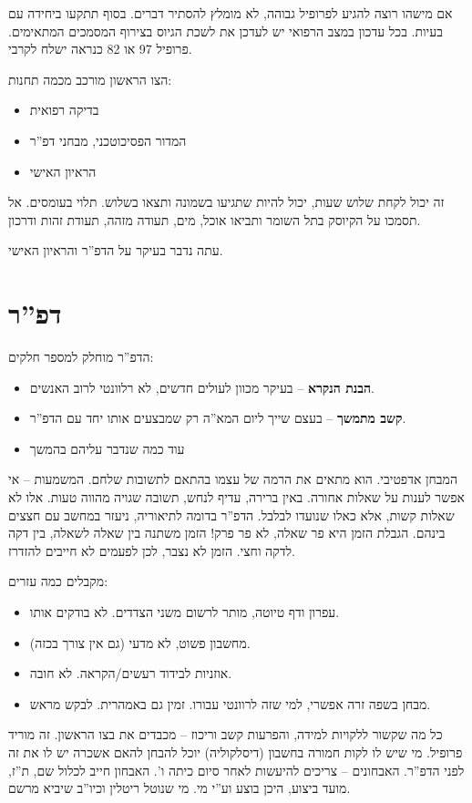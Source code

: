 \documentclass[]{article}
\begin{document}
	אם מישהו רוצה להגיע לפרופיל גבוהה, לא מומלץ להסתיר דברים. בסוף תתקעו ביחידה עם בעיות. בכל עדכון במצב הרפואי יש לעדכן את לשכת הגיוס בצירוף המסמכים המתאימים. פרופיל 97 או 82 כנראה ישלח לקרבי. 
	
	הצו הראשון מורכב מכמה תחנות: 
	\begin{itemize}
		\item בדיקה רפואית
		\item המדור הפסיכוטכני, מבחני דפ''ר
		\item הראיון האישי
	\end{itemize}
	זה יכול לקחת שלוש שעות, יכול להיות שתגיעו בשמונה ותצאו בשלוש. תלוי בעומסים. אל תסמכו על הקיוסק בתל השומר ותביאו אוכל, מים, תעודה מזהה, תעודת זהות ודרכון. 
	
	עתה נדבר בעיקר על הדפ''ר והראיון האישי. 
	
	\section{דפ''ר}
	הדפ''ר מוחלק למספר חלקים: 
	\begin{itemize}
		\item \textbf{הבנת הנקרא} – בעיקר מכוון לעולים חדשים, לא רלוונטי לרוב האנשים. 
		\item \textbf{קשב מתמשך} – בעצם שייך ליום המא''ה רק שמבצעים אותו יחד עם הדפ''ר. 
		\item עוד כמה שנדבר עליהם בהמשך
	\end{itemize}
	המבחן אדפטיבי. הוא מתאים את הרמה של עצמו בהתאם לתשובות שלחם. המשמעות – אי אפשר לענות על שאלות אחורה. באין ברירה, עדיף לנחש, תשובה שגויה מהווה טעות. אלו לא שאלות קשות, אלא כאלו שנועדו לבלבל. הדפ''ר בדומה לתיאוריה, ניעזר במחשב עם חצצים בינהם. הגבלת הזמן היא פר שאלה, לא פר פרק! הזמן משתנה בין שאלה לשאלה, בין דקה לדקה וחצי. הזמן לא נצבר, לכן לפעמים לא חייבים להזדרז. 
	
	מקבלים כמה עזרים: 
	\begin{itemize}
		\item עפרון ודף טיוטה, מותר לרשום משני הצדדים. לא בודקים אותו. 
		\item מחשבון פשוט, לא מדעי (גם אין צורך בכזה). 
		\item אוזניות לבידוד רעשים/הקראה. לא חובה. 
		\item מבחן בשפה זרה אפשרי, למי שזה לרוונטי עבורו. זמין גם באמהרית. לבקש מראש. 
	\end{itemize}
	
	כל מה שקשור ללקויות למידה, והפרעות קשב וריכוז – מכבדים את בצו הראשון. זה מוריד פרופיל. מי שיש לו לקות חמורה בחשבון (דיסלקוליה) יוכל להבחן להאם אשכרה יש לו את זה לפני הדפ''ר. האבחונים – צריכים להיעשות לאחר סיום כיתה ו'. האבחון חייב לכלול שם, ת''ז, מועד ביצוע, היכן בוצע וע''י מי. מי שנוטל ריטלין וכיו''ב שיביא מרשם. 
	
\end{document}
